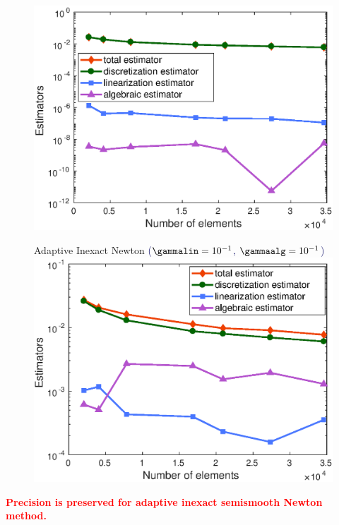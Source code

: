 \begin{frame}
\begin{figure}
\begin{minipage}[c]{.333\linewidth}
\includegraphics[width=\textwidth]{fig_article_chap_1/inexact_resolution_convergence_estimator_number_elements.eps}    

\end{minipage}\hfill
\begin{minipage}[c]{.33\linewidth}
   \centering
   \small{\small{Adaptive Inexact Newton} \hspace{3 cm} \scriptsize{\textcolor{midnightblue}{($\gammalin=10^{-1}$, $\gammaalg=10^{-1}$)}}}
\includegraphics[width=\textwidth]{fig_article_chap_1/adapt_inexact_resolution_convergence_estimator_number_elements.eps}     
\end{minipage}
\end{figure}

\textcolor{red}{\textbf{Precision is preserved for adaptive inexact semismooth Newton method.}}


\end{frame}

